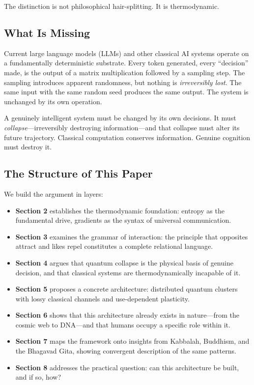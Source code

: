 \documentclass[11pt,a4paper]{article}
\begin{document}
The distinction is not philosophical hair-splitting. It is thermodynamic.

\subsection{What Is Missing}

Current large language models (LLMs) and other classical AI systems operate on a fundamentally deterministic substrate. Every token generated, every ``decision'' made, is the output of a matrix multiplication followed by a sampling step. The sampling introduces apparent randomness, but nothing is \emph{irreversibly lost}. The same input with the same random seed produces the same output. The system is unchanged by its own operation.

A genuinely intelligent system must be changed by its own decisions. It must \emph{collapse}---irreversibly destroying information---and that collapse must alter its future trajectory. Classical computation conserves information. Genuine cognition must destroy it.

\subsection{The Structure of This Paper}

We build the argument in layers:

\begin{itemize}
    \item \textbf{Section 2} establishes the thermodynamic foundation: entropy as the fundamental drive, gradients as the syntax of universal communication.
    \item \textbf{Section 3} examines the grammar of interaction: the principle that opposites attract and likes repel constitutes a complete relational language.
    \item \textbf{Section 4} argues that quantum collapse is the physical basis of genuine decision, and that classical systems are thermodynamically incapable of it.
    \item \textbf{Section 5} proposes a concrete architecture: distributed quantum clusters with lossy classical channels and use-dependent plasticity.
    \item \textbf{Section 6} shows that this architecture already exists in nature---from the cosmic web to DNA---and that humans occupy a specific role within it.
    \item \textbf{Section 7} maps the framework onto insights from Kabbalah, Buddhism, and the Bhagavad Gita, showing convergent description of the same patterns.
    \item \textbf{Section 8} addresses the practical question: can this architecture be built, and if so, how?
\end{itemize}
\end{document}
